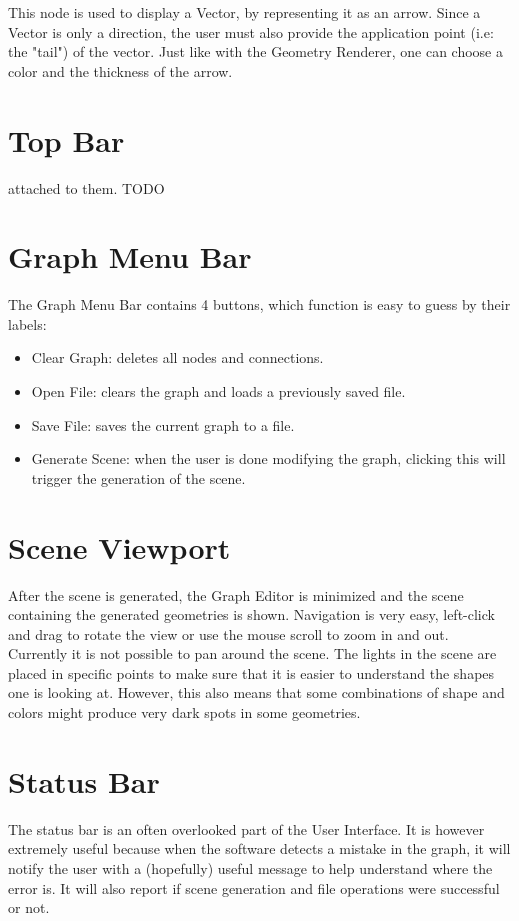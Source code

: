 This node is used to display a Vector, by representing it as an arrow.
Since a Vector is only a direction, the user must also provide the application point (i.e: the "tail") of the vector.
Just like with the Geometry Renderer, one can choose a color and the thickness of the arrow.

\section{Top Bar}

attached to them.
TODO

\section{Graph Menu Bar}

The Graph Menu Bar contains 4 buttons, which function is easy to guess by their labels:

\begin{itemize}
    \item Clear Graph: deletes all nodes and connections.
    \item Open File: clears the graph and loads a previously saved file.
    \item Save File: saves the current graph to a file.
    \item Generate Scene: when the user is done modifying the graph, clicking this
        will trigger the generation of the scene.
\end{itemize}

\section{Scene Viewport}

After the scene is generated, the Graph Editor is minimized and the scene containing the generated
geometries is shown. Navigation is very easy, left-click and drag to rotate the view or use
the mouse scroll to zoom in and out. Currently it is not possible to pan around the scene.
The lights in the scene are placed in specific points to make sure that it is easier to understand
the shapes one is looking at. However, this also means that some combinations of shape and colors
might produce very dark spots in some geometries.

\section{Status Bar}

The status bar is an often overlooked part of the User Interface. It is however extremely useful
because when the software detects a mistake in the graph, it will notify the user
with a (hopefully) useful message to help understand where the error is.
It will also report if scene generation and file operations were successful or not.


